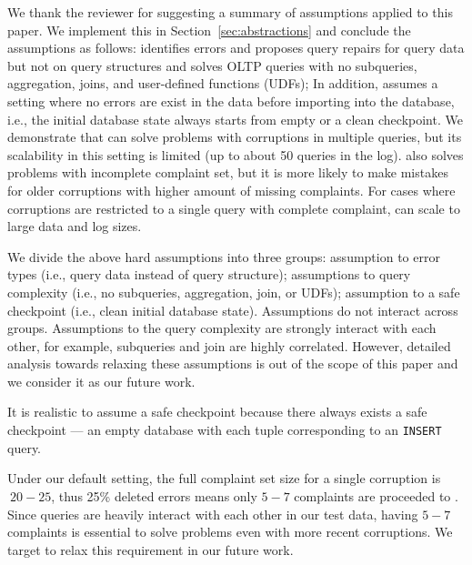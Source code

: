 We thank the reviewer for suggesting a summary of assumptions applied to this paper. We implement this in Section~\ref{sec:abstractions} and 
conclude the assumptions as follows:  \sys identifies errors and proposes query repairs 
for query data but not on query structures and solves 
OLTP queries with no subqueries, aggregation, joins, and user-defined functions (UDFs); 
In addition, \sys assumes a setting where no errors are exist in the data before importing into the database, i.e., 
the initial database state always starts from empty or a clean checkpoint. 
We demonstrate that \sys can solve problems with corruptions in multiple queries, but its scalability in 
this setting is limited (up to about 50 queries in the log).  \sys also solves problems with incomplete
complaint set, but it is more likely to make mistakes for older corruptions with higher amount of missing complaints. 
For cases where corruptions are restricted to a single query with complete complaint, 
\sys can scale to large data and log sizes.

\begin{quote}
\end{quote}

We divide the above hard assumptions into three groups: assumption to error types (i.e., query data instead of query structure);
assumptions to query complexity (i.e., no subqueries, aggregation, join, or UDFs); assumption to 
a safe checkpoint (i.e., clean initial database state). Assumptions do not interact across groups. 
Assumptions to the query complexity are strongly interact with each other, for example, subqueries and join 
are highly correlated. However, detailed analysis towards relaxing these assumptions is out of the scope of this paper and 
we consider it as our future work. 


\begin{quote}
\end{quote}
It is realistic to assume a safe checkpoint because there always exists a safe checkpoint ---
an empty database with each tuple corresponding to an \texttt{INSERT} query. 

\begin{quote}
\end{quote}

Under our default setting, the full complaint set size for a single corruption is $~20-25$, thus 
25\% deleted errors means only $5-7$ complaints are proceeded to \sys. Since queries
are heavily interact with each other in our test data, having $5-7$ complaints is essential 
to solve problems even with more recent corruptions. 
We target to relax this requirement in our future work.

